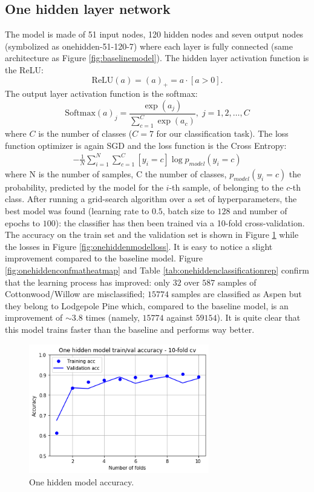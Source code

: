 \subsection{One hidden layer network}
\label{sec:onehidden}
The model is made of 51 input nodes, 120 hidden nodes and seven output nodes (symbolized as onehidden-51-120-7) where each layer is fully connected (same architecture as Figure \ref{fig:baselinemodel}). The hidden layer activation function is the ReLU:
\begin{equation}
\text{ReLU}(a) = (a)_+ = a\cdot[a>0].
\end{equation}
The output layer activation function is the softmax:
\begin{equation}
\text{Softmax}(a)_j = \frac{\exp(a_j)}{\sum_{c=1}^{C} \exp(a_c)}, \; j = 1,2,\dots,C 
\end{equation}
where $C$ is the number of classes ($C=7$ for our classification task). The loss function optimizer is again SGD and the loss function is the Cross Entropy:
\begin{equation}
\begin{aligned}
- \frac{1}{N} \sum_{i=1}^{N}\sum_{c=1}^{C} [y_i = c] \log p_{model}(y_i = c)
\end{aligned}
\end{equation}
where N is the number of samples, C the number of classes, $p_{model}(y_i = c)$ the probability, predicted by the model for the $i$-th sample, of belonging to the $c$-th class. After running a grid-search algorithm over a set of hyperparameters, the best model was found (learning rate to $0.5$, batch size to $128$ and number of epochs to $100$): the classifier has then been trained via a 10-fold cross-validation. The accuracy on the train set and the validation set is shown in Figure \ref{fig:onehiddenmodelacc} while the losses in Figure \ref{fig:onehiddenmodelloss}. It is easy to notice a slight improvement compared to the baseline model. Figure \ref{fig:onehiddenconfmatheatmap} and Table \ref{tab:onehiddenclassificationrep} confirm that the learning process has improved: only $32$ over $587$ samples of Cottonwood/Willow are misclassified; $15774$ samples are classified as Aspen but they belong to Lodgepole Pine which, compared to the baseline model, is an improvement of $\sim3.8$ times (namely, $15774$ against $59154$). It is quite clear that this model trains faster than the baseline and performs way better.
\begin{figure}
\centering
\includegraphics[width=0.7\textwidth]{./TeX_files/img/onehiddenmodelacc.png}
\caption{One hidden model accuracy.}
\label{fig:onehiddenmodelacc}
\end{figure}

